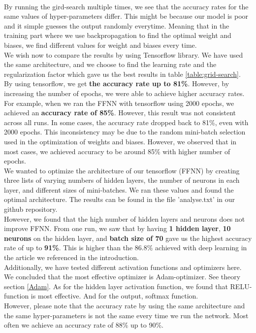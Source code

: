 \documentclass[reprint,english,notitlepage]{revtex4-1}  %
\begin{document}
\vspace{3mm}
\\
By running the gird-search multiple times, we see that the accuracy rates for the same values of hyper-parameters differ. This might be because our model is poor and it simple guesses the output randomly everytime. Meaning that in the training part where we use backpropagation to find the optimal weight and biases, we find different values for weight and biases every time. 
\vspace{3mm}
\\
We wish now to compare the results by using Tensorflow library. We have used the same architecture, and we choose to find the learning rate and the regularization factor which gave us the best results in table \ref{table:grid-search}. 
\vspace{3mm}
\\
By using tensorflow, we get \textbf{the accuracy rate up to 81\%}. However, by increasing the number of epochs, we were able to achieve higher accuracy rates. For example, when we ran the FFNN with tensorflow using 2000 epochs, we achieved an \textbf{accuracy rate of 85\%}. However, this result was not consistent across all runs. In some cases, the accuracy rate dropped back to 81\%, even with 2000 epochs. This inconsistency may be due to the random mini-batch selection used in the optimization of weights and biases. However, we observed that in most cases, we achieved accuracy to be around 85\% with higher number of epochs. 
\vspace{3mm}
\\
We wanted to optimize the architecture of our tensorflow (FFNN) by creating three lists of varying numbers of hidden layers, the number of neurons in each layer, and different sizes of mini-batches. We ran these values and found the optimal architecture. The results can be found in the file 'analyse.txt' in our github repository.
\vspace{3mm}
\\
However, we found that the high number of hidden layers and neurons does not improve FFNN. From one run, we saw that by having \textbf{1 hidden layer}, \textbf{10 neurons} on the hidden layer, and \textbf{batch size of 70} gave us the highest accuracy rate of up to \textbf{91\%}. This is higher than the $86.8\%$ achieved with deep learning in the article we referenced in the introduction.
\vspace{3mm}
\\
Additionally, we have tested different activation functions and optimizers here. We concluded that the most effective optimizer is Adam-optimizer. See theory section \ref{Adam}. As for the hidden layer activation function, we found that RELU-function is most effective. And for the output, softmax function.
\vspace{3mm}
\\
However, please note that the accuracy rate by using the same architecture and the same hyper-parameters is not the same every time we run the network. Most often we achieve an accuracy rate of 88\% up to 90\%. 
\end{document}
